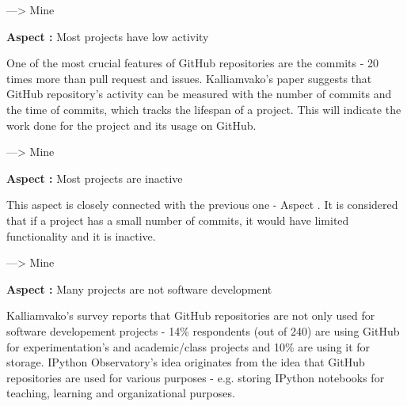 ---> Mine

\vspace{5mm}
\begin{mdframed}
\vspace{1px}
\textbf{Aspect :}  Most projects have low activity
\vspace{1px}
\end{mdframed}
\vspace{2mm}

One of the most crucial features of GitHub repositories are the commits - 20 times more than pull request and issues\cite{kalliamvakoupromises}. Kalliamvako's paper\cite{kalliamvakoupromises} suggests that GitHub repository's activity can be measured with the number of commits and the time of commits, which tracks the lifespan of a project. This will indicate the work done for the project and its usage on GitHub.

---> Mine

\vspace{5mm}
\begin{mdframed}
\vspace{1px}
\textbf{Aspect :}  Most projects are inactive
\vspace{1px}
\end{mdframed}
\vspace{2mm}

This aspect is closely connected with the previous one - Aspect . It is considered that if a project has a small number of commits, it would have limited functionality and it is inactive. 

---> Mine

\vspace{5mm}
\begin{mdframed}
\vspace{1px}
\textbf{Aspect :}  Many projects are not software development
\vspace{1px}
\end{mdframed}
\vspace{2mm}

Kalliamvako's survey\cite{kalliamvakoupromises} reports that GitHub repositories are not only used for software developement projects - 14\% respondents (out of 240) are using GitHub for experimentation's and academic/class projects and 10\% are using it for storage. IPython Observatory's idea originates from the idea that GitHub repositories are used for various purposes - e.g. storing IPython notebooks for teaching, learning and organizational purposes. 

